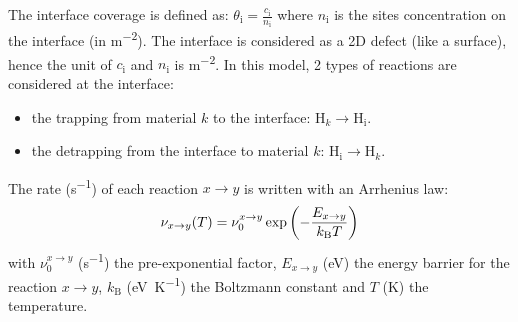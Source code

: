 The interface coverage is defined as: $\theta_\mathrm{i}=\frac{c_\mathrm{i}}{n_\mathrm{i}}$ where $n_\mathrm{i}$ is the sites concentration on the interface (in \si{m^{-2}}).
The interface is considered as a 2D defect (like a surface), hence the unit of $c_\mathrm{i}$ and $n_\mathrm{i}$ is \si{m^{-2}}.
\indent In this model, 2 types of reactions are considered at the interface:
\begin{itemize}
    \item the trapping from material $k$ to the interface: $\mathrm{H}_k \rightarrow \mathrm{H_i}$.
    \item the detrapping from the interface to material $k$: $\mathrm{H_i} \rightarrow \mathrm{H}_k$.
\end{itemize}
The rate (\si{s^{-1}}) of each reaction $x\rightarrow y$ is written with an Arrhenius law: 
\begin{equation}
\nu_{x\rightarrow y}(T)=\nu_0^{x\rightarrow y}\exp\left(-\frac{E_{x\rightarrow y}}{k_\mathrm{B}T}\right)
\labeq{TST}
\end{equation}
with $\nu_0^{x\rightarrow y}$ (\si{s^{-1}}) the pre-exponential factor, $E_{x\rightarrow y}$ (\si{eV}) the energy barrier for the reaction $x\rightarrow y$, $k_\mathrm{B}$ (\si{eV.K^{-1}}) the Boltzmann constant and $T$ (\si{K}) the temperature.

